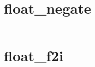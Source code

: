\documentclass[11pt,a4paper]{ctexart}
\begin{document}
\section{float\_negate}
\inputminted{c}{src/2.92.c}

\section{float\_f2i}
\inputminted{c}{src/2.96.c}
\end{document}
